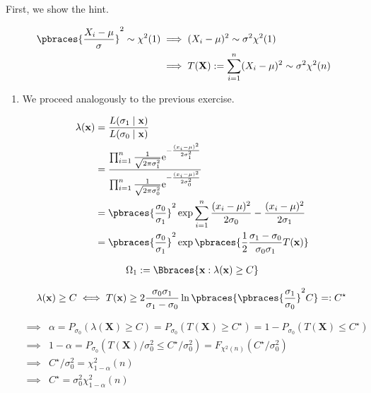 \begin{solution}

First, we show the hint.

\begin{align*}
    \pbraces{\frac{X_i - \mu}{\sigma}}^2 \sim \chi^2(1)
    & \implies
    (X_i - \mu)^2 \sim \sigma^2 \chi^2(1) \\
    & \implies
    T(\mathbf X) := \sum_{i=1}^n (X_i - \mu)^2 \sim \sigma^2 \chi^2(n)
\end{align*}

\begin{enumerate}[label = (\alph*)]

    \item We proceed analogously to the previous exercise.
    
    \begin{align*}
        \lambda(\mathbf x)
        & =
        \frac
        {
            L(\sigma_1 \mid \mathbf x)
        }{
            L(\sigma_0 \mid \mathbf x)
        } \\
        & =
        \frac
        {
            \prod_{i=1}^n
                \frac{1}{\sqrt{2 \pi \sigma_1^2}}
                \mathrm e^{-\frac{(x_i - \mu)^2}{2 \sigma_1^2}}
        }{
            \prod_{i=1}^n
                \frac{1}{\sqrt{2 \pi \sigma_0^2}}
                \mathrm e^{-\frac{(x_i - \mu)^2}{2 \sigma_0^2}}
        } \\
        & =
        \pbraces{\frac{\sigma_0}{\sigma_1}}^2
        \exp \sum_{i=1}^n \frac{(x_i - \mu)^2}{2 \sigma_0} - \frac{(x_i - \mu)^2}{2 \sigma_1} \\
        & =
        \pbraces{\frac{\sigma_0}{\sigma_1}}^2
        \exp \pbraces{\frac{1}{2} \frac{\sigma_1 - \sigma_0}{\sigma_0 \sigma_1} T(\mathbf x)}
    \end{align*}

    \begin{align*}
        \Omega_1
        :=
        \Bbraces{\mathbf x: \lambda(\mathbf x) \geq C}
    \end{align*}

    \begin{align*}
        \lambda(\mathbf x) \geq C
        \iff
        T(\mathbf x) \geq 2 \frac{\sigma_0 \sigma_1}{\sigma_1 - \sigma_0} \ln \pbraces{\pbraces{\frac{\sigma_1}{\sigma_0}}^2 C} =: C^\star
    \end{align*}

    \begin{align*}
        \implies &
        \alpha = P_{\sigma_0}(\lambda(\mathbf X) \geq C) = P_{\sigma_0}(T(\mathbf X) \geq C^\star) = 1 - P_{\sigma_0}(T(\mathbf X) \leq C^\star) \\
        \implies &
        1 - \alpha = P_{\sigma_0}(T(\mathbf X) / \sigma_0^2 \leq C^\star / \sigma_0^2) = F_{\chi^2(n)}(C^\star / \sigma_0^2) \\
        \implies &
        C^\star / \sigma_0^2 = \chi_{1 - \alpha}^2(n) \\
        \implies &
        C^\star = \sigma_0^2 \chi_{1 - \alpha}^2(n)
    \end{align*}


\end{enumerate}
\end{solution}
